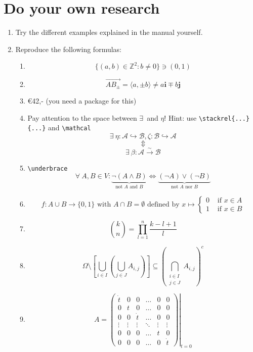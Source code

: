 \documentclass{article}
\begin{document}
\section{Do your own research}
\begin{enumerate}
	\item Try the different examples explained in the manual yourself.
	\item Reproduce the following formulas:
	\begin{enumerate}
		\item \[  \{(a,b) \in \mathbb{Z}^2 : b \neq 0\} \ni (0,1) \]
		\item \[\overrightarrow{AB_{\pm}} = \langle a, \pm b \rangle \neq a\mathbf{i} \mp b\mathbf{j}\]
		\item \euro 42,- (you need a package for this)
		\item Pay attention to the space between \textquotesingle\(\exists\)\textquotesingle \ and \textquotesingle\(\eta\)\textquotesingle! Hint: use \verb|\stackrel{...}{...}| and \verb.\mathcal.
			\[\exists \ \eta :\mathcal{A} \hookrightarrow \mathcal{B}, \zeta : \mathcal{B} \hookrightarrow \mathcal{A}\]
			\[\Updownarrow\]
			\[\exists \ \beta : \mathcal{A} \stackrel{\sim}{\longrightarrow} \mathcal{B}\]
		\item \verb+\underbrace+
			\[\forall \ A, B \in V :  \underbrace{\neg(A \wedge B)}_{\text{not } A \text{ and } B} \Longleftrightarrow \underbrace{(\neg A) \vee (\neg B)}_{\text{not } A \text{ nor } B}\]
		\item 			\[f : A \cup B \to \{0,1\} \text{ with } A \cap B = \emptyset \text{ defined by } x \mapsto \begin{cases} 0 & \text{ if } x \in A\\1 & \text{ if } x \in B \end{cases}\]
		\item 
			\[\binom{k}{n} = \prod_{l = 1}^n\frac{k-l+1}{l}\]
		\item	
			\[\Omega \setminus \left[\bigcup_{i \in I}\left(\bigcup_{j \in J} A_{i,j} \right)\right] \subseteq \left(\bigcap_{\begin{smallmatrix} i \in I \\ j \in J \end{smallmatrix}} A_{i,j}\right)^c\]
		\item
			\[A = \left.\left(
			\begin{array}{cccccc}
				\dot{t} 	& 0 		& 0		& \ldots 	& 0 		& 0\\
				0 		& t 		& 0		& \ldots 	& 0 		& 0\\
				0 		& 0 		& \dot{t} & \ldots 	& 0 		& 0\\
				\vdots 	& \vdots 	& \vdots 	& \ddots 	& \vdots 	& \vdots \\
				0 		& 0 		& 0 		& \ldots 	& t 		& 0\\
				0 		& 0 		& 0 		& \ldots 	& 0 		& \dot{t}
			\end{array}\right)\right|_{t = 0}\]
	\end{enumerate}
\end{enumerate}
\end{document}
